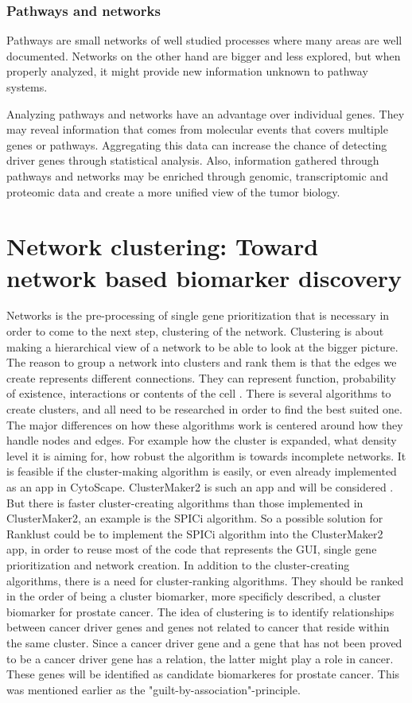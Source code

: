\subsection{Pathways and networks} %
Pathways are small networks of well studied processes where many areas are well
documented. Networks on the other hand are bigger and less explored, but when
properly analyzed, it might provide new information unknown to pathway systems.

Analyzing pathways and networks have an advantage over individual genes. They
may reveal information that comes from molecular events that covers multiple
genes or pathways. Aggregating this data can increase the chance of detecting
driver genes through statistical analysis. Also, information gathered through
pathways and networks may be enriched through genomic, transcriptomic and
proteomic data and create a more unified view of the tumor biology.

\chapter{Network clustering: Toward network based biomarker discovery}
Networks is the pre-processing of single gene prioritization that is necessary
in order to come to the next step, clustering of the network. Clustering is
about making a hierarchical view of a network to be able to look at the bigger
picture. The reason to group a network into clusters and rank them
is that the edges we create represents different connections. They can represent
function, probability of existence, interactions or contents of the cell
\cite{siri}. There is several algorithms to create clusters, and all need to be
researched in order to find the best suited one. The major differences on how
these algorithms work is centered around how they handle nodes and edges. For
example how the cluster is expanded, what density level it is aiming for, how
robust the algorithm is towards incomplete networks. It is feasible if the
cluster-making algorithm is easily, or even already implemented as an app in
CytoScape. ClusterMaker2 is such an app and will be considered \cite{cm2}. But
there is faster cluster-creating algorithms than those implemented in
ClusterMaker2, an example is the SPICi \cite{spici} algorithm. So a possible
solution for Ranklust could be to implement the SPICi algorithm into the
ClusterMaker2 app, in order to reuse most of the code that represents the GUI,
single gene prioritization and network creation. In addition to the
cluster-creating algorithms, there is a need for cluster-ranking algorithms.
They should be ranked in the order of being a cluster biomarker, more specificly
described, a cluster biomarker for prostate cancer. The idea of clustering is to
identify relationships between cancer driver genes and genes not related to
cancer that reside within the same cluster. Since a cancer driver gene and a
gene that has not been proved to be a cancer driver gene has a relation, the
latter might play a role in cancer. These genes will be identified as candidate
biomarkeres for prostate cancer. This was mentioned earlier as the
"guilt-by-association"-principle.


